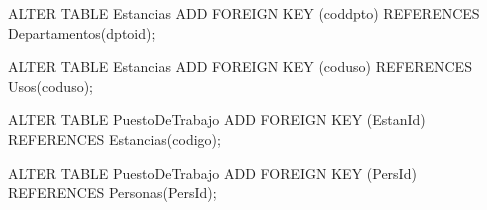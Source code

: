 \lstset{caption=Añadir claves ajenas,label=sql:crearForeignKey}
\begin{SQL}
ALTER TABLE Estancias 
ADD FOREIGN KEY (coddpto) REFERENCES Departamentos(dptoid);

ALTER TABLE Estancias 
ADD FOREIGN KEY (coduso) REFERENCES Usos(coduso);

ALTER TABLE PuestoDeTrabajo 
ADD FOREIGN KEY (EstanId) REFERENCES Estancias(codigo);

ALTER TABLE PuestoDeTrabajo 
ADD FOREIGN KEY (PersId) REFERENCES Personas(PersId);
\end{SQL}